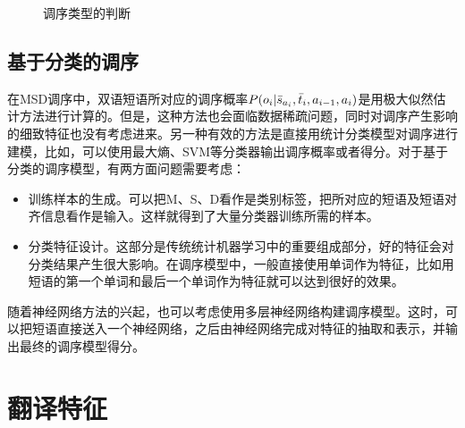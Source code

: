 \begin{figure}[htp]
\centering

\caption{调序类型的判断}
\label{fig:7-19}
\end{figure}


\subsection{基于分类的调序}

\parinterval 在MSD调序中，双语短语所对应的调序概率${P}(o_i| \bar{s}_{a_i}, \bar{t}_i, a_{i-1}, a_i)$是用极大似然估计方法进行计算的。但是，这种方法也会面临数据稀疏问题，同时对调序产生影响的细致特征也没有考虑进来。另一种有效的方法是直接用统计分类模型对调序进行建模，比如，可以使用最大熵、SVM等分类器输出调序概率或者得分。对于基于分类的调序模型，有两方面问题需要考虑：

\begin{itemize}
\vspace{0.5em}
\item 训练样本的生成。可以把M、S、D看作是类别标签，把所对应的短语及短语对齐信息看作是输入。这样就得到了大量分类器训练所需的样本。
\vspace{0.5em}
\item 分类特征设计。这部分是传统统计机器学习中的重要组成部分，好的特征会对分类结果产生很大影响。在调序模型中，一般直接使用单词作为特征，比如用短语的第一个单词和最后一个单词作为特征就可以达到很好的效果。
\vspace{0.5em}
\end{itemize}

\parinterval 随着神经网络方法的兴起，也可以考虑使用多层神经网络构建调序模型。这时，可以把短语直接送入一个神经网络，之后由神经网络完成对特征的抽取和表示，并输出最终的调序模型得分。

\sectionnewpage
\section{翻译特征}

